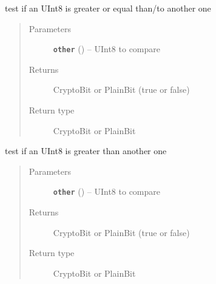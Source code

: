 \documentclass[letterpaper,10pt,english]{sphinxmanual}
\begin{document}
\begin{fulllineitems}
\begin{fulllineitems}
\end{fulllineitems}


\begin{fulllineitems}
\label{datatypes.integers:datatypes.integers.UInt8.UInt8.__ge__}
test if an UInt8 is greater or equal than/to another one
\begin{quote}\begin{description}
\item[{Parameters}] \leavevmode
\textbf{\texttt{other}} ({\hyperref[datatypes.integers:datatypes.integers.UInt8.UInt8]{}}) -- UInt8 to compare

\item[{Returns}] \leavevmode
CryptoBit or PlainBit (true or false)

\item[{Return type}] \leavevmode
CryptoBit or PlainBit

\end{description}\end{quote}

\end{fulllineitems}


\begin{fulllineitems}
\label{datatypes.integers:datatypes.integers.UInt8.UInt8.__gt__}
test if an UInt8 is greater than another one
\begin{quote}\begin{description}
\item[{Parameters}] \leavevmode
\textbf{\texttt{other}} ({\hyperref[datatypes.integers:datatypes.integers.UInt8.UInt8]{}}) -- UInt8 to compare

\item[{Returns}] \leavevmode
CryptoBit or PlainBit (true or false)

\item[{Return type}] \leavevmode
CryptoBit or PlainBit

\end{description}\end{quote}

\end{fulllineitems}


\end{fulllineitems}
\end{document}
